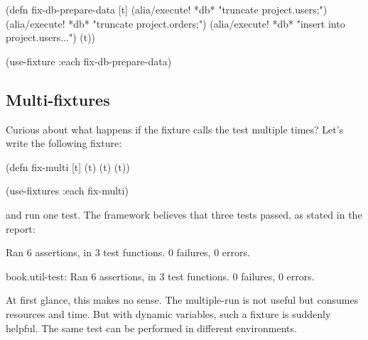 \else

\begin{english}
  \begin{clojure}
(defn fix-db-prepare-data [t]
  (alia/execute! *db* "truncate project.users;")
  (alia/execute! *db* "truncate project.orders;")
  (alia/execute! *db* "insert into project.users...")
  (t))

(use-fixture :each fix-db-prepare-data)
  \end{clojure}
\end{english}

\fi

\subsection{Multi-fixtures}

\label{multi-fixture}


Curious about what happens if the fixture calls the test multiple times? Let's write the following fixture:

\begin{english}
  \begin{clojure}
(defn fix-multi [t]
  (t) (t) (t))

(use-fixtures :each fix-multi)
  \end{clojure}
\end{english}

\noindent
and run one test. The framework believes that three tests passed, as stated in the report:

\ifnarrow

\begin{english}
  \begin{text}
Ran 6 assertions, in 3 test functions.
0 failures, 0 errors.
  \end{text}
\end{english}

\else

\begin{english}
  \begin{text}
book.util-test: Ran 6 assertions, in 3 test functions.
0 failures, 0 errors.
  \end{text}
\end{english}

\fi

At first glance, this makes no sense. The multiple-run is not useful but consumes resources and time. But with dynamic variables, such a fixture is suddenly helpful. The same test can be performed in different environments.

